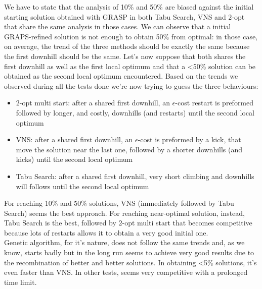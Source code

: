 We have to state that the analysis of 10\% and 50\% are biased against the
initial starting solution obtained with GRASP in both Tabu Search, VNS and
$2$-opt that share the same analysis in those cases. We can observe that a
initial GRAPS-refined solution is not enough to obtain 50\% from optimal: in
those case, on average, the trend of the three methods should be exactly the
same because the first downhill should be  the same. Let's now suppose that both
shares the first downhill as well as the first local optimum and that a <50\%
solution can be obtained as the second local optimum encountered. Based on the
trends we observed during all the tests done we're now trying to guess the three
behaviours: \begin{itemize}
    \item $2$-opt multi start: after a shared first downhill, an $\epsilon$-cost
        restart is preformed followed by longer, and costly, downhills (and
        restarts) until the second local optimum
    \item VNS: after a shared first downhill, an $\epsilon$-cost
         is preformed by a kick, that move the solution near the
        last one, followed by a shorter downhills (and kicks) until the second
        local optimum
    \item Tabu Search: after a shared first downhill, very short climbing and
        downhills will follows until the second local optimum
\end{itemize}
For reaching 10\% and 50\% solutions, VNS (immediately followed by Tabu Search)
seems the best approach. For reaching near-optimal solution, instead, Tabu
Search is the best, followed by $2$-opt multi start that becomes competitive
because lots of restarts allows it to obtain a very good initial one.\\

Genetic algorithm, for it's nature, does not follow the same trends and, as we
know, starts badly but in the long run seems to achieve very good results due to
the recombination of better and better solutions. In obtaining <5\% solutions,
it's even faster than VNS. In other tests, seems very competitive with a prolonged time limit. 
